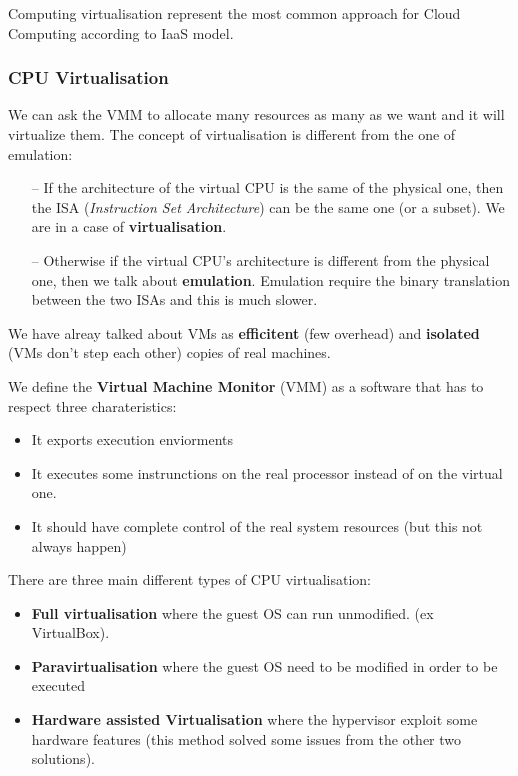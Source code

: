 Computing virtualisation represent the most common approach for Cloud Computing according to IaaS model.




\subsubsection{CPU Virtualisation}
We can ask the VMM to allocate many resources as many as we want and it will virtualize them.
The concept of virtualisation is different from the one of emulation:
\begin{itemize}
    \item[--] If the architecture of the virtual CPU is the same of the physical one, then the ISA (\textit{Instruction Set Architecture}) can be the same one (or a subset). We are in a case of \textbf{virtualisation}.
    \item[--] Otherwise if the virtual CPU's architecture is different from the physical one, then we talk about \textbf{emulation}. Emulation require the binary translation between the two ISAs and this is much slower.
\end{itemize}

We have alreay talked about VMs as \textbf{efficitent} (few overhead) and \textbf{isolated} (VMs don't step each other) copies of real machines.

We define the \textbf{Virtual Machine Monitor} (VMM) as a software that has to respect three charateristics:
\begin{itemize}
    \item It exports execution enviorments
    \item It executes some instrunctions on the real processor instead of on the virtual one.
    \item It should have complete control of the real system resources (but this not always happen)
\end{itemize}

There are three main different types of CPU virtualisation:
\begin{itemize}
    \item \textbf{Full virtualisation} where the guest OS can run unmodified. (ex VirtualBox).
    \item \textbf{Paravirtualisation} where the guest OS need to be modified in order to be executed
    \item \textbf{Hardware assisted Virtualisation} where the hypervisor exploit some hardware features (this method solved some issues from the other two solutions).
\end{itemize}

